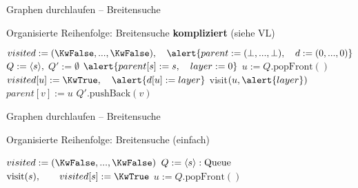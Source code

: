 {		\begin{frame}{Graphen durchlaufen – Breitensuche}
			\vspace{-.3\baselineskip}
			\begin{exampleblock}{Organisierte Reihenfolge: Breitensuche \textbf{kompliziert} (siehe VL) }
				\begin{algorithm}[H]
					\small \vspace{-.4\baselineskip}
					 {
						$visited := (\KwFalse, ... , \KwFalse), \quad \alert{parent := (\bot, ..., \bot), \quad d := (0, ..., 0)}$\;
						$Q := \langle s \rangle,$ \quad \alert{$Q' := \emptyset$}   \;
						$\alert{parent[s] := s, \quad layer := 0}$ \;
						 {
							$u := Q.\text{popFront}()$\;
							 {
								$visited[u] := \KwTrue, \quad \alert{d[u] := layer}$ \;
								visit$(u, \alert{layer})$   \;
								 {
									\alert{$parent[v] := u$} \;
									$Q'.\text{pushBack}(v)$   \;
								} \vspace{-.2\baselineskip}
							}
							\alert{
							} \vspace{-.2\baselineskip}
						} \vspace{-.2\baselineskip}
					}
				\end{algorithm} \vspace{-.5\baselineskip}
			\end{exampleblock}
		\end{frame}
}

\begin{frame}{Graphen durchlaufen – Breitensuche}
	\vspace{-1.3\baselineskip}
	\begin{exampleblock}{Organisierte Reihenfolge: Breitensuche (einfach)}
		\begin{algorithm}[H]
			 {
				$visited := (\KwFalse, ... , \KwFalse)$\;
				$Q := \llist{s}: \|Queue|$ \;
				$\|visit|(s),\hphantom{, 0} \quad visited[s] := \KwTrue$ \;
				 {
					$u := Q.\text{popFront}()$\;
				} 
			}
		\end{algorithm} 
	\end{exampleblock}
\end{frame}

